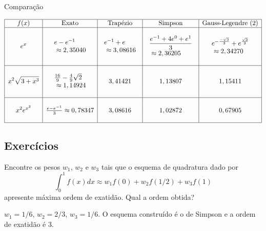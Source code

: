 \begin{ex} Comparação
  \begin{small}
$$
\begin{array}{|c|c|c|c|c|}
\hline
f(x)&\text{Exato}&\text{Trapézio} &\text{Simpson} & \text{Gauss-Legendre (2)}\\
\hline
&&&&\\
\displaystyle e^{x}&\displaystyle \begin{array}{l}e-e^{-1}\\~\approx 2,35040\end{array}  & \displaystyle \begin{array}{l}e^{-1}+e \\ ~\approx 3,08616 \end{array}& \begin{array}{l}\displaystyle \frac{e^{-1}+4e^{0}+e^{1}}{3}\\ ~\approx  2,36205\end{array} & \begin{array}{l}\displaystyle e^{-\frac{-\sqrt{3}}{3}}+e^{\frac{\sqrt{3}}{3}}\\ ~\approx   2,34270\end{array}\\
&&&&\\
 \hline
&&&&\\
\displaystyle x^2\sqrt{3+x^3}& \begin{array}{l}\frac{16}{9}-\frac{4}{9}\sqrt{2}\\~\approx 1,14924\end{array} & 3,41421  & 1,13807 & 1,15411\\
&&&&\\
 \hline
&&&&\\
  \displaystyle x^2e^{x^3}&\frac{e-e^{-1}}{3}\approx 0,78347 & 3,08616     & 1,02872  & 0,67905\\
&&&&\\
 \hline
    \end{array}
$$    
  \end{small}
\end{ex}

\subsection*{Exercícios}

\begin{exer}
Encontre os pesos $w_1$, $w_2$ e $w_3$ tais que o esquema de quadratura dado por
$$\int_{0}^{1}f(x)dx\approx w_1f(0)+w_2f(1/2)+w_3 f(1)$$
apresente máxima ordem de exatidão. Qual a ordem obtida?
\end{exer}
\begin{resp}
  
 $w_1=1/6$, $w_2=2/3$, $w_3=1/6$. O esquema construído é o de Simpson e a ordem de exatidão é 3.   
  
\end{resp}

